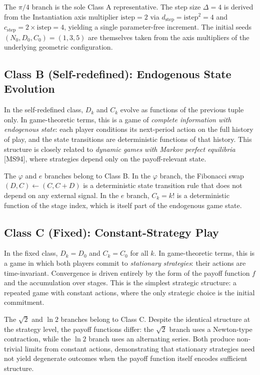 \documentclass[12pt]{article}
\begin{document}
The \(\pi/4\) branch is the sole Class A representative. The step size
\(\Delta = 4\) is derived from the Instantiation axis multiplier
\(\mathrm{istep} = 2\) via \(d_{\mathrm{step}} = \mathrm{istep}^2 = 4\)
and \(c_{\mathrm{step}} = 2 \times \mathrm{istep} = 4\), yielding a
single parameter-free increment. The initial seeds
\((N_0, D_0, C_0) = (1, 3, 5)\) are themselves taken from the axis
multipliers of the underlying geometric configuration.

\subsection{Class B (Self-redefined): Endogenous State Evolution}\label{class-b-self-redefined-endogenous-state-evolution}

In the self-redefined class, \(D_k\) and \(C_k\) evolve as functions of
the previous tuple only. In game-theoretic terms, this is a game of
\emph{complete information with endogenous state}: each player
conditions its next-period action on the full history of play, and the
state transitions are deterministic functions of that history. This
structure is closely related to \emph{dynamic games with Markov perfect
equilibria} {[}MS94{]}, where strategies depend only on the
payoff-relevant state.

The \(\varphi\) and \(e\) branches belong to Class B. In the \(\varphi\)
branch, the Fibonacci swap \((D, C) \leftarrow (C, C + D)\) is a
deterministic state transition rule that does not depend on any external
signal. In the \(e\) branch, \(C_k = k!\) is a deterministic function of
the stage index, which is itself part of the endogenous game state.

\subsection{Class C (Fixed): Constant-Strategy Play}\label{class-c-fixed-constant-strategy-play}

In the fixed class, \(D_k = D_0\) and \(C_k = C_0\) for all \(k\). In
game-theoretic terms, this is a game in which both players commit to
\emph{stationary strategies}: their actions are time-invariant.
Convergence is driven entirely by the form of the payoff function \(f\)
and the accumulation over stages. This is the simplest strategic
structure: a repeated game with constant actions, where the only
strategic choice is the initial commitment.

The \(\sqrt{2}\) and \(\ln 2\) branches belong to Class C. Despite the
identical structure at the strategy level, the payoff functions differ:
the \(\sqrt{2}\) branch uses a Newton-type contraction, while the
\(\ln 2\) branch uses an alternating series. Both produce non-trivial
limits from constant actions, demonstrating that stationary strategies
need not yield degenerate outcomes when the payoff function itself
encodes sufficient structure.
\end{document}
